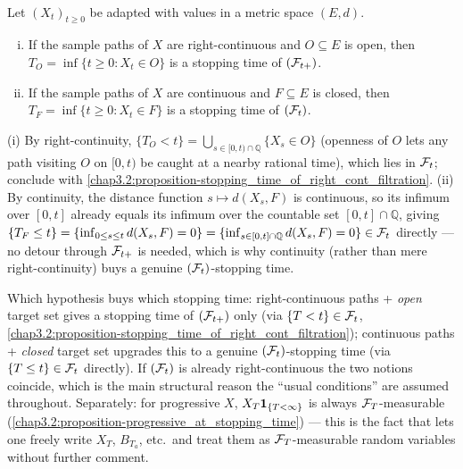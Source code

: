 \begin{proposition} \label{chap3.2:proposition-hitting_times}  \\
Let $(X_t)_{t\ge0}$ be adapted with values in a metric space $(E,d)$.
\begin{enumerate}[(i)]
    \item If the sample paths of $X$ are right-continuous and $O\subseteq E$ is open, then $T_O=\inf\{t\ge0:X_t\in O\}$ is a stopping time of $(\mathcal{F}_{t+})$.
    \item If the sample paths of $X$ are continuous and $F\subseteq E$ is closed, then $T_F=\inf\{t\ge0:X_t\in F\}$ is a stopping time of $(\mathcal{F}_t)$.
\end{enumerate}
\end{proposition}
\begin{proofidea}
(i) By right-continuity, $\{T_O<t\}=\bigcup_{s\in[0,t)\cap\mathbb Q}\{X_s\in O\}$ (openness of $O$ lets any path visiting $O$ on $[0,t)$ be caught at a nearby rational time), which lies in $\mathcal{F}_t$; conclude with \cref{chap3.2:proposition-stopping_time_of_right_cont_filtration}. (ii) By continuity, the distance function $s\mapsto d(X_s,F)$ is continuous, so its infimum over $[0,t]$ already equals its infimum over the countable set $[0,t]\cap\mathbb Q$, giving $\{T_F\le t\}=\{\inf_{0\le s\le t}d(X_s,F)=0\}=\{\inf_{s\in[0,t]\cap\mathbb Q}d(X_s,F)=0\}\in\mathcal{F}_t$ directly --- no detour through $\mathcal{F}_{t+}$ is needed, which is why continuity (rather than mere right-continuity) buys a genuine $(\mathcal{F}_t)$-stopping time.
\end{proofidea}
\begin{quizbox} Which hypothesis buys which stopping time: right-continuous paths + \emph{open} target set gives a stopping time of $(\mathcal{F}_{t+})$ only (via $\{T<t\}\in\mathcal{F}_t$, \cref{chap3.2:proposition-stopping_time_of_right_cont_filtration}); continuous paths + \emph{closed} target set upgrades this to a genuine $(\mathcal{F}_t)$-stopping time (via $\{T\le t\}\in\mathcal{F}_t$ directly). If $(\mathcal{F}_t)$ is already right-continuous the two notions coincide, which is the main structural reason the ``usual conditions'' are assumed throughout. Separately: for progressive $X$, $X_T\mathbf{1}_{\{T<\infty\}}$ is always $\mathcal{F}_T$-measurable (\cref{chap3.2:proposition-progressive_at_stopping_time}) --- this is the fact that lets one freely write $X_T$, $B_{T_a}$, etc.\ and treat them as $\mathcal{F}_T$-measurable random variables without further comment. \end{quizbox}





